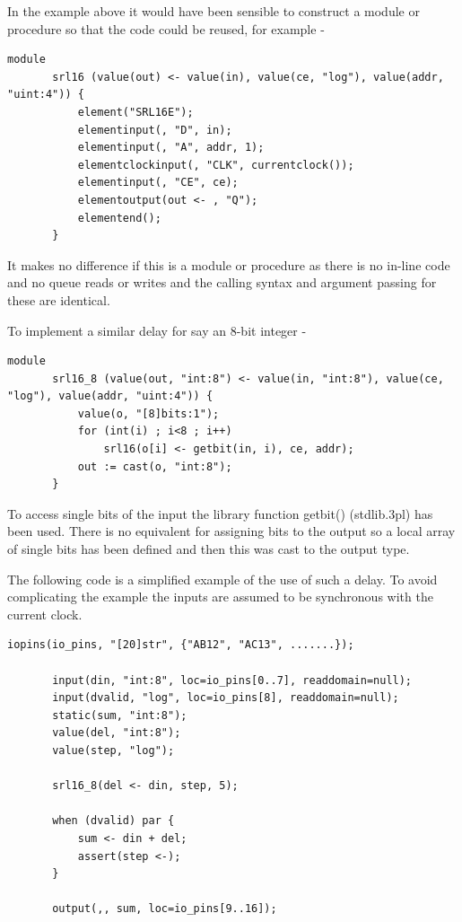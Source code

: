     In the example above it would have been sensible to construct a module or
    procedure so that the code could be reused, for example - 
    \begin{lstlisting}[gobble=4, language=threepl]
       module
       srl16 (value(out) <- value(in), value(ce, "log"), value(addr, "uint:4")) {
           element("SRL16E");
           elementinput(, "D", in);
           elementinput(, "A", addr, 1);
           elementclockinput(, "CLK", currentclock());
           elementinput(, "CE", ce);
           elementoutput(out <- , "Q");
           elementend();
       }
    \end{lstlisting}
    It makes no difference if this is a module or procedure as there is no in-line
    code and no queue reads or writes and the calling syntax and argument passing
    for these are identical.
    
    To implement a similar delay for say an 8-bit integer -
    \begin{lstlisting}[gobble=4, language=threepl]
       module
       srl16_8 (value(out, "int:8") <- value(in, "int:8"), value(ce, "log"), value(addr, "uint:4")) {
           value(o, "[8]bits:1");
           for (int(i) ; i<8 ; i++)
               srl16(o[i] <- getbit(in, i), ce, addr); 
           out := cast(o, "int:8");
       }
    \end{lstlisting}
    To access single bits of the input the library function getbit() (stdlib.3pl)
    has been used. There is no equivalent for assigning bits to the output so a
    local array of single bits has been defined and then this was cast to the
    output type.
    
    The following code is a simplified example of the use of such a delay. To avoid
    complicating the example the inputs are assumed to be synchronous with the
    current clock. 
    \begin{lstlisting}[gobble=4, language=threepl]
       iopins(io_pins, "[20]str", {"AB12", "AC13", .......});
       
       input(din, "int:8", loc=io_pins[0..7], readdomain=null);
       input(dvalid, "log", loc=io_pins[8], readdomain=null);
       static(sum, "int:8");
       value(del, "int:8");
       value(step, "log");

       srl16_8(del <- din, step, 5);

       when (dvalid) par {
           sum <- din + del;
           assert(step <-);
       }

       output(,, sum, loc=io_pins[9..16]);
    \end{lstlisting}
    

